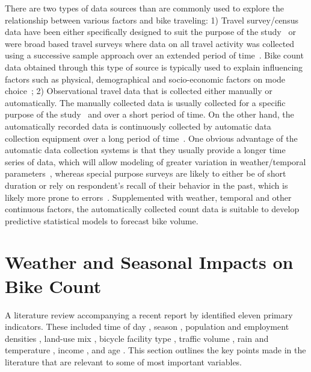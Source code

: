 \documentclass [11pt, proquest] {uwthesis}[2015/03/03]
\begin{document}
There are two types of data sources than are commonly used to explore the relationship between various factors and bike traveling: 1) Travel survey/census data have been either specifically designed to suit the purpose of the study~\cite{Palma97} or were broad based travel surveys where data on all travel activity was collected using a successive sample approach over an extended period of time~\cite{Richardson:2000aa}. Bike count data obtained through this type of source is typically used to explain influencing factors such as physical, demographical and socio-economic factors on mode choice~\cite{Parkin:2008aa,Helbich:2014aa}; 2) Observational travel data that is collected either manually or automatically. The manually collected data is usually collected for a specific purpose of the study~\cite{Nankervis99} and over a short period of time. On the other hand, the automatically recorded data is continuously collected by automatic data collection equipment over a long period of time~\cite{Griswold:2011aa, Nosal:2014aa, Miranda-Moreno:2011aa, Thomas:2009aa}. One obvious advantage of the automatic data collection systems is that they usually provide a longer time series of data, which will allow modeling of greater variation in weather/temporal parameters~\cite{Ahmed12}, whereas special purpose surveys are likely to either be of short duration or rely on respondent's recall of their behavior in the past, which is likely more prone to errors~\cite{Palma97}. Supplemented with weather, temporal and other continuous factors, the automatically collected count data is suitable to develop predictive statistical models to forecast bike volume.  


\section{Weather and Seasonal Impacts on Bike Count}

A literature review accompanying a recent report by \cite{Bassok:2011aa} identified eleven primary indicators. These included 
time of day \cite{Schwartz:1999aa}, season \cite{Niemeier:1996aa}, population and employment densities \cite{McCahil:2008aa,Pinjari:2009aa}, land-use mix \cite{Pinjari:2009aa}, bicycle facility type \cite{Hunt:2007aa}, traffic volume \cite{McDonald:2007aa}, rain and temperature \cite{Niemeier:1996aa,Parkin:2008aa}, income \cite{Turner:1998aa}, and age \cite{Hunt:2007aa}. This section outlines the key points made in the literature that are relevant to some of most important variables. 
\end{document}
